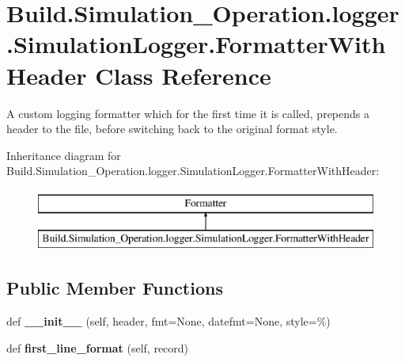 \hypertarget{class_build_1_1_simulation___operation_1_1logger_1_1_simulation_logger_1_1_formatter_with_header}{}\section{Build.\+Simulation\+\_\+\+Operation.\+logger.\+Simulation\+Logger.\+Formatter\+With\+Header Class Reference}
\label{class_build_1_1_simulation___operation_1_1logger_1_1_simulation_logger_1_1_formatter_with_header}


A custom logging formatter which for the first time it is called, prepends a header to the file, before switching back to the original format style.  


Inheritance diagram for Build.\+Simulation\+\_\+\+Operation.\+logger.\+Simulation\+Logger.\+Formatter\+With\+Header\+:\begin{figure}[H]
\begin{center}
\leavevmode
\includegraphics[height=2.000000cm]{class_build_1_1_simulation___operation_1_1logger_1_1_simulation_logger_1_1_formatter_with_header}
\end{center}
\end{figure}
\subsection*{Public Member Functions}
\begin{DoxyCompactItemize}
\item 
\mbox{\label{class_build_1_1_simulation___operation_1_1logger_1_1_simulation_logger_1_1_formatter_with_header_a6ed2bb917fb21e709d4964039beaa105}} 
def {\bfseries \+\_\+\+\_\+init\+\_\+\+\_\+} (self, header, fmt=None, datefmt=None, style=\textquotesingle{}\%\textquotesingle{})
\item 
\mbox{\label{class_build_1_1_simulation___operation_1_1logger_1_1_simulation_logger_1_1_formatter_with_header_afa321e7f80452748fec676dd42ab70bc}} 
def {\bfseries first\+\_\+line\+\_\+format} (self, record)
\end{DoxyCompactItemize}
